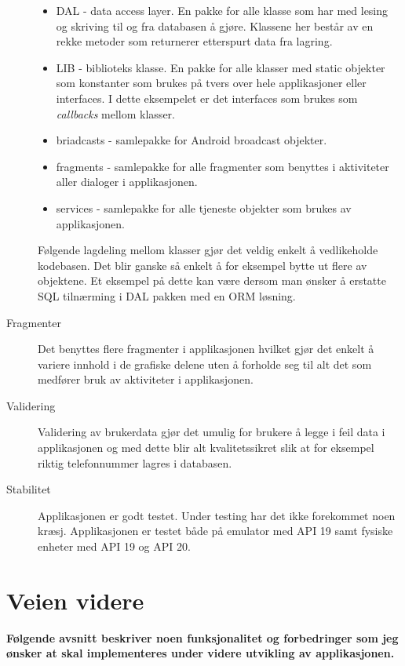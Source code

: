 \begin{description}
\begin{itemize}
\item DAL - data access layer. En pakke for alle klasse som har med lesing og skriving til og fra databasen å gjøre. Klassene her består av en rekke metoder som returnerer etterspurt data fra lagring.

\item LIB - biblioteks klasse. En pakke for alle klasser med static objekter som konstanter som brukes på tvers over hele applikasjoner eller interfaces. I dette eksempelet er det interfaces som brukes som \textit{callbacks} mellom klasser.

\item briadcasts - samlepakke for Android broadcast objekter.

\item fragments - samlepakke for alle fragmenter som benyttes i aktiviteter aller dialoger i applikasjonen. 

\item services - samlepakke for alle tjeneste objekter som brukes av applikasjonen. 
\end{itemize}

Følgende lagdeling mellom klasser gjør det veldig enkelt å vedlikeholde kodebasen. Det blir ganske så enkelt å for eksempel bytte ut flere av objektene. Et eksempel på dette kan være dersom man ønsker å erstatte SQL tilnærming i DAL pakken med en ORM løsning. 

\item[Fragmenter]
Det benyttes flere fragmenter i applikasjonen hvilket gjør det enkelt å variere innhold i de grafiske delene uten å forholde seg til alt det som medfører bruk av aktiviteter i applikasjonen. 

\item[Validering]
Validering av brukerdata gjør det umulig for brukere å legge i feil data i applikasjonen og med dette blir alt kvalitetssikret slik at for eksempel riktig telefonnummer lagres i databasen.

\item[Stabilitet]
Applikasjonen er godt testet. Under testing har det ikke forekommet noen kræsj. Applikasjonen er testet både på emulator med API 19 samt fysiske enheter med API 19 og API 20. 


\end{description}





\chapter{Veien videre}
\textbf{Følgende avsnitt beskriver noen funksjonalitet og forbedringer som jeg ønsker at skal implementeres under videre utvikling av applikasjonen. }

